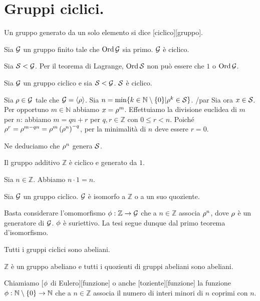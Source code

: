 \section{Gruppi ciclici.}\label{GruppiCiclici}
\begin{Definition}
	Un gruppo generato da un solo elemento si dice
	[ciclico][gruppo].
\end{Definition}
\begin{Theorem}
	Sia $\mathcal{G}$ un gruppo finito tale che
	$\operatorname{\operatorname{Ord}}{\mathcal{G}}$ sia primo.
	$\mathcal{G}$ \`e ciclico.
\end{Theorem}
\Proof
Sia $\mathcal{S} < \mathcal{G}$.
Per il teorema di Lagrange, $\operatorname{\operatorname{Ord}}{\mathcal{S}}$
non pu\`o essere che $1$ o $\operatorname{\operatorname{Ord}}{\mathcal{G}}$.
\EndProof
\begin{Theorem}
	Sia $\mathcal{G}$ un gruppo ciclico e
	sia $\mathcal{S} < \mathcal{G}$.
	$\mathcal{S}$ \`e ciclico.
\end{Theorem}
\Proof
Sia $\rho \in \mathcal{G}$ tale che
$\mathcal{G} = \left < \rho \right >$.
Sia $n = \min \lbrace k \in \mathbb{N} \setminus \lbrace 0 \rbrace |
\rho^k \in \mathcal{S} \rbrace$.
/par
Sia ora $x \in \mathcal{S}$.
Per opportuno $m \in \mathbb{N}$ abbiamo
$x = \rho^m$.
Effettuiamo la divisione euclidea di $m$ per $n$:
abbiamo
$m = qn + r$ per $q, r \in \mathbb{Z}$ con
$0 \leq r < n$.
Poich\'e $\rho^r = \rho^{m - qn} =
\rho^m \left ( \rho^n \right )^{- q}$,
per la minimalit\`a di $n$ deve essere $r = 0$.
\par
Ne deduciamo che $\rho^n$ genera $\mathcal{S}$.
\EndProof
\begin{Theorem}
	Il gruppo additivo $\mathbb{Z}$ \`e ciclico
	e generato da $1$.
\end{Theorem}
\Proof
Sia $n \in \mathbb{Z}$.
Abbiamo $n \cdot 1 = n$.
\EndProof
\begin{Theorem}
	Sia $\mathcal{G}$ un gruppo ciclico.
	$\mathcal{G}$ \`e isomorfo a $\mathbb{Z}$ o
	a un suo quoziente.
\end{Theorem}
\Proof
Basta considerare l'omomorfismo
$\phi: \mathbb{Z} \rightarrow \mathcal{G}$
che a $n \in \mathbb{Z}$ associa $\rho^n$,
dove $\rho$ \`e un generatore di $\mathcal{G}$.
$\phi$ \`e suriettivo.
La tesi segue dunque dal primo teorema d'isomorfismo.
\EndProof
\begin{Corollary}
	Tutti i gruppi ciclici sono abeliani.
\end{Corollary}
\Proof
$\mathbb{Z}$ \`e un gruppo abeliano e tutti i
quozienti di gruppi abeliani sono abeliani.
\EndProof
\begin{Definition}
	Chiamiamo [$\phi$ di Eulero][funzione] o anche [toziente][funzione] la funzione $\phi: \mathbb{N} \setminus \lbrace 0 \rbrace \rightarrow \mathbb{N}$ che a $n \in \mathbb{Z}$ associa il numero di interi minori di $n$ coprimi con $n$.
\end{Definition}
